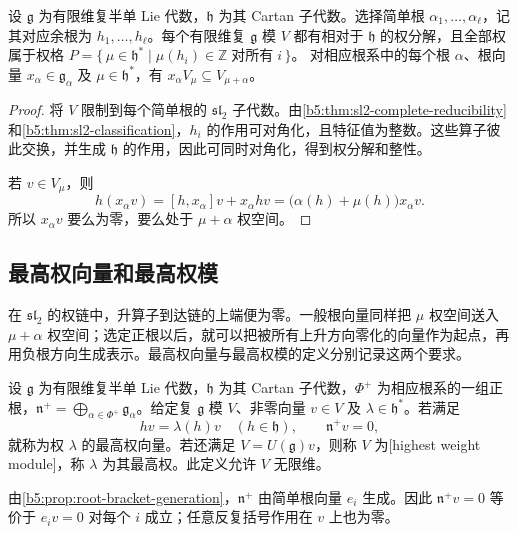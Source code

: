 \begin{proposition}\label{b5:prop:finite-module-weights}
	设 \(\mathfrak g\) 为有限维复半单 Lie 代数，\(\mathfrak h\) 为其 Cartan 子代数。选择简单根 \(\alpha_1,\ldots,\alpha_\ell\)，记其对应余根为 \(h_1,\ldots,h_\ell\)。每个有限维复 \(\mathfrak g\) 模 \(V\) 都有相对于 \(\mathfrak h\) 的权分解，且全部权属于权格 \(P=\bigl\{\,\mu\in\mathfrak h^*\mid\mu(h_i)\in\mathbb Z\;\text{对所有}\;i\,\bigr\}\)。 对相应根系中的每个根 \(\alpha\)、根向量 \(x_\alpha\in\mathfrak g_\alpha\) 及 \(\mu\in\mathfrak h^*\)，有 \(x_\alpha V_\mu\subseteq V_{\mu+\alpha}\)。
\end{proposition}
\begin{proof}
	将 \(V\) 限制到每个简单根的 \(\mathfrak{sl}_2\) 子代数。由\cref{b5:thm:sl2-complete-reducibility}和\cref{b5:thm:sl2-classification}，\(h_i\) 的作用可对角化，且特征值为整数。这些算子彼此交换，并生成 \(\mathfrak h\) 的作用，因此可同时对角化，得到权分解和整性。

	若 \(v\in V_\mu\)，则
	\[
		h(x_\alpha v)=[h,x_\alpha]v+x_\alpha hv =\bigl(\alpha(h)+\mu(h)\bigr)x_\alpha v.
	\]
	所以 \(x_\alpha v\) 要么为零，要么处于 \(\mu+\alpha\) 权空间。
\end{proof}

\subsection{最高权向量和最高权模}
\label{b5:subsec:1802:02}

在 \(\mathfrak{sl}_2\) 的权链中，升算子到达链的上端便为零。一般根向量同样把 \(\mu\) 权空间送入 \(\mu+\alpha\) 权空间；选定正根以后，就可以把被所有上升方向零化的向量作为起点，再用负根方向生成表示。最高权向量与最高权模的定义分别记录这两个要求。

\begin{definition}\label{b5:def:highest-weight-module}
	设 \(\mathfrak g\) 为有限维复半单 Lie 代数，\(\mathfrak h\) 为其 Cartan 子代数，\(\Phi^+\) 为相应根系的一组正根，\(\mathfrak n^+=\bigoplus_{\alpha\in\Phi^+}\mathfrak g_\alpha\)。给定复 \(\mathfrak g\) 模 \(V\)、非零向量 \(v\in V\) 及 \(\lambda\in\mathfrak h^*\)。若满足
	\[
		hv=\lambda(h)v\quad(h\in\mathfrak h),\qquad \mathfrak n^+v=0,
	\]
	就称为权 \(\lambda\) 的最高权向量。若还满足 \(V=U(\mathfrak g)v\)，则称 \(V\) 为[highest weight module]，称 \(\lambda\) 为其最高权。此定义允许 \(V\) 无限维。
\end{definition}

由\cref{b5:prop:root-bracket-generation}，\(\mathfrak n^+\) 由简单根向量 \(e_i\) 生成。因此 \(\mathfrak n^+v=0\) 等价于 \(e_iv=0\) 对每个 \(i\) 成立；任意反复括号作用在 \(v\) 上也为零。

